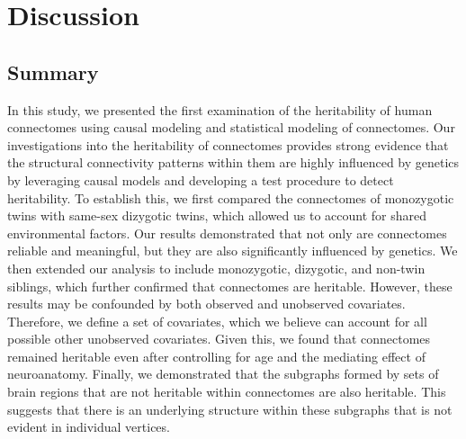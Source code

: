 \section{Discussion} 
\subsection{Summary} \label{discussion:summary}
In this study, we presented the first examination of the heritability of human connectomes using causal modeling and statistical modeling of connectomes. Our investigations into the heritability of connectomes provides strong evidence that the structural connectivity patterns within them are highly influenced by genetics by leveraging causal models and developing a test procedure to detect heritability. To establish this, we first compared the connectomes of monozygotic twins with same-sex dizygotic twins, which allowed us to account for shared environmental factors. Our results demonstrated that not only are connectomes reliable and meaningful, but they are also significantly influenced by genetics. We then extended our analysis to include monozygotic, dizygotic, and non-twin siblings, which further confirmed that connectomes are heritable. However, these results may be confounded by both observed and unobserved covariates. Therefore, we define a set of covariates, which we believe can account for all possible other unobserved covariates. Given this, we found that connectomes remained heritable even after controlling for age and the mediating effect of neuroanatomy. Finally, we demonstrated that the subgraphs formed by sets of brain regions that are not heritable within connectomes are also heritable. This suggests that there is an underlying structure within these subgraphs that is not evident in individual vertices. 

